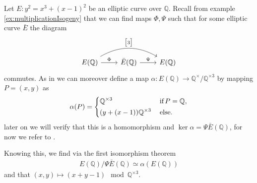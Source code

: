\begin{example} \label{ex:explicitComputation}
  Let $E: y^2 = x^3 + (x - 1)^2$ be an elliptic curve over $\mathbb{Q}$.
  Recall from example \ref{ex:multiplicationIsogeny} that
  we can find maps $\Phi, \Psi$ such that for some elliptic curve
  $\bar{E}$ the diagram
  \begin{equation*}
  \begin{tikzcd}
    E(\mathbb{Q}) \ar[rr, bend left, "\begin{bmatrix}3\end{bmatrix}"] \ar[r, "\Phi"] & \bar{E}(\mathbb{Q}) \ar[r, "\Psi"] & E(\mathbb{Q})
  \end{tikzcd}
  \end{equation*}
  commutes.
  As in \cite[Section 3.1]{moniqueThesis} we can moreover define a map $\alpha: E(\mathbb{Q}) \to \mathbb{Q}^\times / \mathbb{Q}^{\times 3}$
  by mapping $P = (x, y)$ as
  \begin{align*}
    \alpha(P) =
    \begin{dcases}
      \mathbb{Q}^{\times 3} \:&\text{if}\, P = \mathbb{Q}, \\
      (y + (x - 1)) \mathbb{Q}^{\times 3}\:&\text{else}.
    \end{dcases}
  \end{align*}
  later on we will verify that this is
  a homomorphism and $\ker \alpha = \Psi \bar{E}(\mathbb{Q})$, for now we refer to \cite[Theorem 5]{moniqueThesis}.

  Knowing this, we find via the first isomorphism theorem
  \begin{align*}
    E(\mathbb{Q}) / \Psi \bar{E}(\mathbb{Q}) \simeq \alpha(E(\mathbb{Q}))
  \end{align*}
  and that $(x,y) \mapsto (x + y - 1) \mod \mathbb{Q}^{\times 3}$.


\end{example}
